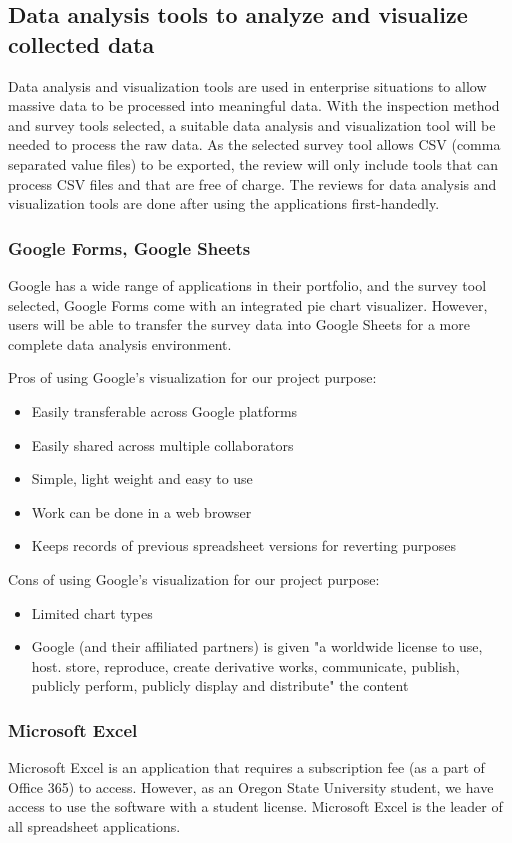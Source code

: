 \documentclass[10pt,journal,compsoc,draftclsnofoot]{IEEEtran}
\begin{document}
\subsection{Data analysis tools to analyze and visualize collected data}
Data analysis and visualization tools are used in enterprise situations to allow massive data to be processed into meaningful data.
With the inspection method and survey tools selected, a suitable data analysis and visualization tool will be needed to process the raw data.
As the selected survey tool allows CSV (comma separated value files) to be exported, the review will only include tools that can process CSV files and that are free of charge.
The reviews for data analysis and visualization tools are done after using the applications first-handedly. 

\subsubsection{Google Forms, Google Sheets}
Google has a wide range of applications in their portfolio, and the survey tool selected, Google Forms come with an integrated pie chart visualizer.
However, users will be able to transfer the survey data into Google Sheets for a more complete data analysis environment.

Pros of using Google's visualization for our project purpose:
\begin{itemize}
\item Easily transferable across Google platforms
\item Easily shared across multiple collaborators
\item Simple, light weight and easy to use
\item Work can be done in a web browser
\item Keeps records of previous spreadsheet versions for reverting purposes
\end{itemize}

Cons of using Google's visualization for our project purpose:
\begin{itemize}
\item Limited chart types
\item Google (and their affiliated partners) is given "a worldwide license to use, host. store, reproduce, create derivative works, communicate, publish, publicly perform, publicly display and distribute" the content \cite{google}
\end{itemize}

\subsubsection{Microsoft Excel}
Microsoft Excel is an application that requires a subscription fee (as a part of Office 365) to access.
However, as an Oregon State University student, we have access to use the software with a student license.
Microsoft Excel is the leader of all spreadsheet applications.
\end{document}
